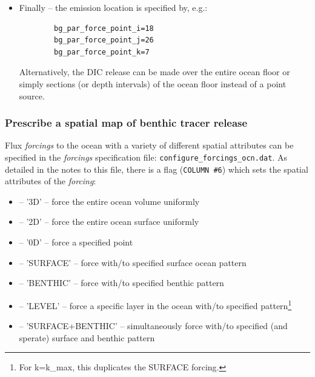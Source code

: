 \documentclass[11pt,fleqn]{book} %
\begin{document}
\begin{itemize}[noitemsep]
\vspace{1mm}
        \item Finally -- the emission location is specified by, e.g.: 
\\\vspace{-2mm}\small\begin{verbatim}
        bg_par_force_point_i=18
        bg_par_force_point_j=26
        bg_par_force_point_k=7
\end{verbatim}\normalsize\vspace{-2mm}
Alternatively, the DIC release can be made over the entire ocean floor or simply sections (or depth intervals) of the ocean floor instead of a point source.

\end{itemize}

%
\subsubsection{Prescribe a spatial map of benthic tracer release}
\vspace{1mm}

Flux \textit{forcings} to the ocean with a variety of different spatial attributes can be specified in the \textit{forcings} specification file: \texttt{configure\_forcings\_ocn.dat}. As detailed in the notes to this file, there is a flag (\texttt{COLUMN \#6}) which sets the spatial attributes of the \textit{forcing}: 
\vspace{1mm}
\begin{itemize}[noitemsep]
\item [3] -- '3D' -- force the entire ocean volume uniformly
\item [2] -- '2D' -- force the entire ocean surface uniformly
\item [0] -- '0D' -- force a specified point
\item [-1] -- 'SURFACE' -- force with/to specified surface ocean pattern
\item [-2] -- 'BENTHIC' -- force with/to specified benthic pattern
\item [-3] -- 'LEVEL' -- force a specific layer in the ocean with/to specified pattern\footnote{For k=k\_max, this duplicates the SURFACE forcing.}
\item [-4] -- 'SURFACE+BENTHIC' -- simultaneously force with/to specified (and sperate) surface and benthic pattern
\end{itemize}
\vspace{1mm}
\end{document}
